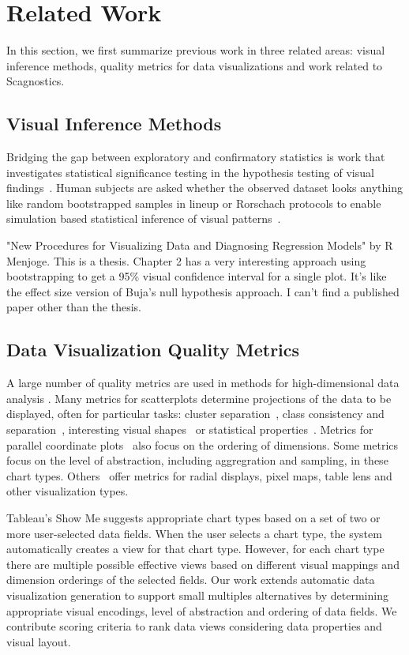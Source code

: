 \section{Related Work}
In this section, we first summarize previous work in three related areas: visual inference methods, quality metrics for data visualizations and work related to Scagnostics.

\subsection{Visual Inference Methods}
Bridging the gap between exploratory and confirmatory statistics is work that investigates statistical significance testing in the hypothesis testing of visual findings~\cite{Wickham2013,Majumder2013}. Human subjects are asked whether the observed dataset looks anything like random bootstrapped samples in lineup or Rorschach protocols to enable simulation based statistical inference of visual patterns~\cite{Buja2009}.

"New Procedures for Visualizing Data and Diagnosing Regression Models" by R Menjoge. This is a thesis. Chapter 2 has a very interesting approach using bootstrapping to get a 95\% visual confidence interval for a single plot. It's like the effect size version of Buja's null hypothesis approach. I can't find a published paper other than the thesis.

\subsection{Data Visualization Quality Metrics}
A large number of quality metrics are used in methods for high-dimensional data analysis \cite{Bertini2011}.  Many metrics for scatterplots determine projections of the data to be displayed, often for particular tasks: cluster separation~\cite{Sedlmair2012,Tatu2009}, class consistency and separation~\cite{Sips2009,Schafer2013}, interesting visual shapes~\cite{Wilkinson2005} or statistical properties~\cite{Kandel2012,Seo2005}. Metrics for parallel coordinate plots~\cite{Ankerst1998, Dasgupta2010, Johansson2009, Yang2003} also focus on the ordering of dimensions. Some metrics~\cite{Bertini2006, Cui2006} focus on the level of abstraction, including aggregration and sampling, in these chart types. Others~\cite{Albuquerque2010, Ankerst1998, Schneidewind2006, Yang2003} offer metrics for radial displays, pixel maps, table lens and other visualization types. 

Tableau's Show Me \cite{mackinlay2007} suggests appropriate chart types based on a set of two or more user-selected data fields. When the user selects a chart type, the system automatically creates a view for that chart type. However, for each chart type there are multiple possible effective views based on different visual mappings and dimension orderings of the selected fields. Our work extends automatic data visualization generation to support small multiples alternatives by determining appropriate visual encodings, level of abstraction and ordering of data fields. We contribute scoring criteria to rank data views considering data properties and visual layout.


